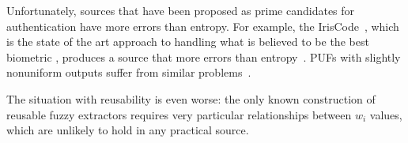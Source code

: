 \documentclass[11pt]{article}
\newcommand{\Huse}{\mathrm{H}_{\mathtt{usable}}}
\begin{document}

Unfortunately, sources that have been proposed as prime candidates for authentication have more errors than entropy.
For example, the IrisCode~\cite{daugman2004}, which is the state of the art approach to handling what is believed to be the best biometric \cite{prabhakar2003biometric}, produces a source that more errors than entropy~\cite[Section 5]{blanton2009biometric}. PUFs with slightly nonuniform outputs suffer from similar problems~\cite{koeberl2014entropy}.



The situation with reusability is even worse: the only known construction of reusable fuzzy extractors \cite{Boyen2004} requires very particular relationships between $w_i$ values, which are unlikely to hold in any practical source.
\end{document}
